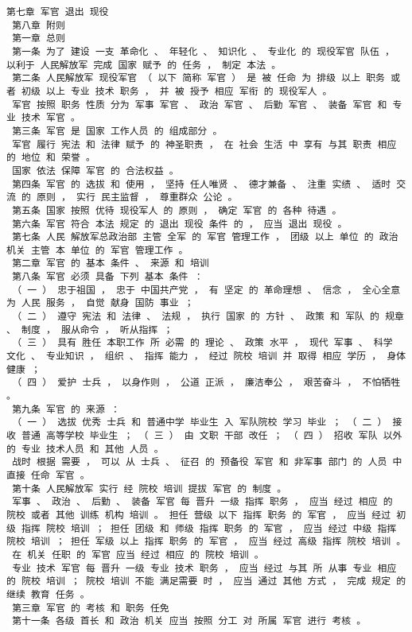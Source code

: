\documentclass{article}
\begin{document}
\begin{Verbatim}[commandchars=\\\{\}]
 第七章 军官 退出 现役 
 第八章 附则 
 第一章 总则 
 第一条 为了 建设 一支 革命化 、 年轻化 、 知识化 、 专业化 的 现役军官 队伍 ， 以利于 人民解放军 完成 国家 赋予 的 任务 ， 制定 本法 。 
 第二条 人民解放军 现役军官 （ 以下 简称 军官 ） 是 被 任命 为 排级 以上 职务 或者 初级 以上 专业 技术 职务 ， 并 被 授予 相应 军衔 的 现役军人 。 
 军官 按照 职务 性质 分为 军事 军官 、 政治 军官 、 后勤 军官 、 装备 军官 和 专业 技术 军官 。 
 第三条 军官 是 国家 工作人员 的 组成部分 。 
 军官 履行 宪法 和 法律 赋予 的 神圣职责 ， 在 社会 生活 中 享有 与其 职责 相应 的 地位 和 荣誉 。 
 国家 依法 保障 军官 的 合法权益 。 
 第四条 军官 的 选拔 和 使用 ， 坚持 任人唯贤 、 德才兼备 、 注重 实绩 、 适时 交流 的 原则 ， 实行 民主监督 ， 尊重群众 公论 。 
 第五条 国家 按照 优待 现役军人 的 原则 ， 确定 军官 的 各种 待遇 。 
 第六条 军官 符合 本法 规定 的 退出 现役 条件 的 ， 应当 退出 现役 。 
 第七条 人民 解放军总政治部 主管 全军 的 军官 管理工作 ， 团级 以上 单位 的 政治 机关 主管 本 单位 的 军官 管理工作 。 
 第二章 军官 的 基本 条件 、 来源 和 培训 
 第八条 军官 必须 具备 下列 基本 条件 ： 
 （ 一 ） 忠于祖国 ， 忠于 中国共产党 ， 有 坚定 的 革命理想 、 信念 ， 全心全意 为 人民 服务 ， 自觉 献身 国防 事业 ； 
 （ 二 ） 遵守 宪法 和 法律 、 法规 ， 执行 国家 的 方针 、 政策 和 军队 的 规章 、 制度 ， 服从命令 ， 听从指挥 ； 
 （ 三 ） 具有 胜任 本职工作 所 必需 的 理论 、 政策 水平 ， 现代 军事 、 科学 文化 、 专业知识 ， 组织 、 指挥 能力 ， 经过 院校 培训 并 取得 相应 学历 ， 身体健康 ； 
 （ 四 ） 爱护 士兵 ， 以身作则 ， 公道 正派 ， 廉洁奉公 ， 艰苦奋斗 ， 不怕牺牲 。 
 第九条 军官 的 来源 ： 
 （ 一 ） 选拔 优秀 士兵 和 普通中学 毕业生 入 军队院校 学习 毕业 ； （ 二 ） 接收 普通 高等学校 毕业生 ； （ 三 ） 由 文职 干部 改任 ； （ 四 ） 招收 军队 以外 的 专业 技术人员 和 其他 人员 。 
 战时 根据 需要 ， 可以 从 士兵 、 征召 的 预备役 军官 和 非军事 部门 的 人员 中 直接 任命 军官 。 
 第十条 人民解放军 实行 经 院校 培训 提拔 军官 的 制度 。 
 军事 、 政治 、 后勤 、 装备 军官 每 晋升 一级 指挥 职务 ， 应当 经过 相应 的 院校 或者 其他 训练 机构 培训 。 担任 营级 以下 指挥 职务 的 军官 ， 应当 经过 初级 指挥 院校 培训 ； 担任 团级 和 师级 指挥 职务 的 军官 ， 应当 经过 中级 指挥 院校 培训 ； 担任 军级 以上 指挥 职务 的 军官 ， 应当 经过 高级 指挥 院校 培训 。 
 在 机关 任职 的 军官 应当 经过 相应 的 院校 培训 。 
 专业 技术 军官 每 晋升 一级 专业 技术 职务 ， 应当 经过 与其 所 从事 专业 相应 的 院校 培训 ； 院校 培训 不能 满足需要 时 ， 应当 通过 其他 方式 ， 完成 规定 的 继续 教育 任务 。 
 第三章 军官 的 考核 和 职务 任免 
 第十一条 各级 首长 和 政治 机关 应当 按照 分工 对 所属 军官 进行 考核 。 

\end{Verbatim}
\end{document}
